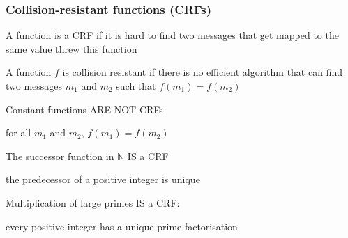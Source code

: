 \documentclass[aspectratio=169, lualatex, handout, 10pt,dvipsnames,svgnames]{beamer} %
\begin{document}
\begin{frame}

  \frametitle{Collision-resistant functions (CRFs)}

  A function is a CRF if it is hard to find two messages that get mapped to the same value threw this function

  \begin{definition}
    A function $f$ is collision resistant if there is no efficient algorithm that can find two messages $m_1$ and $m_2$ such that $f(m_1) = f(m_2)$
  \end{definition}
  \bigskip{}
  \pause

  \color{vert}

  Constant functions ARE NOT CRFs
  
  \quad for all $m_1$ and $m_2$, $f(m_1) = f(m_2)$
  \bigskip{}
  \pause

  The successor function in $\mathbb N$ IS a CRF

  \quad the predecessor of a positive integer is unique
  \bigskip{} 
  \pause

  Multiplication of large primes IS a CRF:
    
  \quad every positive integer has a unique prime factorisation
  \color{black}


\end{frame}
\end{document}
